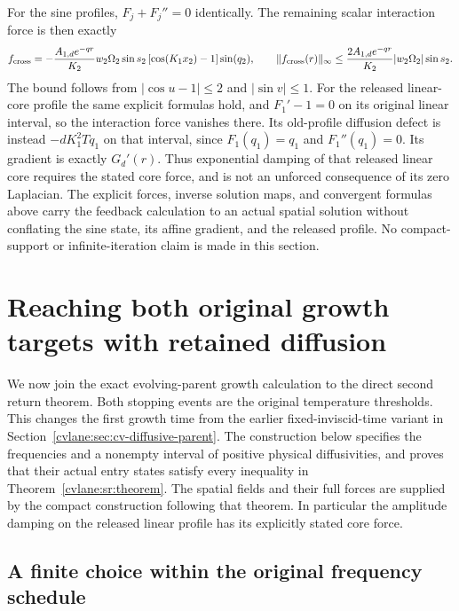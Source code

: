 For the sine profiles, $F_j+F_j''=0$ identically. The remaining
scalar interaction force is then exactly
\[
 f_{\rm cross}=-\frac{A_{1,d}e^{-qr}}{K_2}
   w_2\Omega_2\sin s_2\,[\cos(K_1x_2)-1]\sin(q_2),
 \qquad
 \|f_{\rm cross}(r)\|_\infty
 \leq\frac{2A_{1,d}e^{-qr}}{K_2}|w_2\Omega_2|\sin s_2.
\]
The bound follows from $|\cos u-1|\leq2$ and $|\sin v|\leq1$.
For the released linear-core profile the same explicit formulas hold,
and $F_1'-1=0$ on its original linear interval, so the interaction
force vanishes there. Its old-profile diffusion defect is instead
$-dK_1^2Tq_1$ on that interval, since $F_1(q_1)=q_1$ and
$F_1''(q_1)=0$. Its gradient is exactly $G_d'(r)$.
Thus exponential damping of that released linear core requires the
stated core force, and is not an unforced consequence of its zero
Laplacian. The explicit forces, inverse solution maps, and convergent
formulas above carry the feedback calculation to an actual spatial
solution without conflating the sine state, its affine gradient, and
the released profile. No compact-support or infinite-iteration claim
is made in this section.


\section{Reaching both original growth targets with retained diffusion}
\label{cvlane:ave:section}

We now join the exact evolving-parent growth calculation to the direct
second return theorem. Both stopping events are the original temperature
thresholds. This changes the first growth time from the earlier
fixed-inviscid-time variant in Section~\ref{cvlane:sec:cv-diffusive-parent}.
The construction below specifies the frequencies and a nonempty interval
of positive physical diffusivities, and proves that their actual entry
states satisfy every inequality in Theorem~\ref{cvlane:sr:theorem}.
The spatial fields and their full forces are supplied by the compact
construction following that theorem. In particular the amplitude damping
on the released linear profile has its explicitly stated core force.

\subsection{A finite choice within the original frequency schedule}

